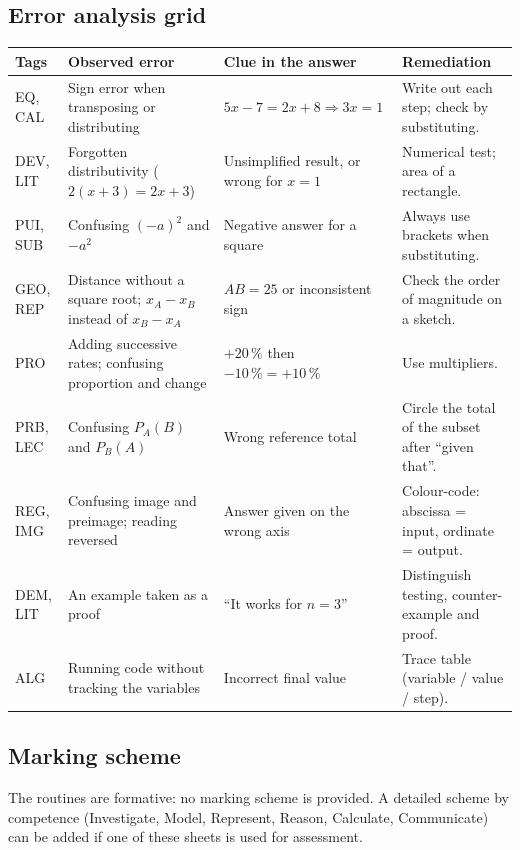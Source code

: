 \subsection*{Error analysis grid}
{\footnotesize\renewcommand{\arraystretch}{1.2}
\begin{tabular}{@{}p{2.2cm} p{4.4cm} p{4.8cm} p{4.6cm}@{}}\toprule
Tags & Observed error & Clue in the answer & Remediation \\ \midrule
EQ, CAL & Sign error when transposing or distributing & $5x-7=2x+8\Rightarrow3x=1$ & Write out each step; check by substituting. \\
DEV, LIT & Forgotten distributivity ($2(x+3)=2x+3$) & Unsimplified result, or wrong for $x=1$ & Numerical test; area of a rectangle. \\
PUI, SUB & Confusing $(-a)^2$ and $-a^2$ & Negative answer for a square & Always use brackets when substituting. \\
GEO, REP & Distance without a square root; $x_A-x_B$ instead of $x_B-x_A$ & $AB=25$ or inconsistent sign & Check the order of magnitude on a sketch. \\
PRO & Adding successive rates; confusing proportion and change & $+20\,\%$ then $-10\,\%=+10\,\%$ & Use multipliers. \\
PRB, LEC & Confusing $P_A(B)$ and $P_B(A)$ & Wrong reference total & Circle the total of the subset after ``given that''. \\
REG, IMG & Confusing image and preimage; reading reversed & Answer given on the wrong axis & Colour-code: abscissa = input, ordinate = output. \\
DEM, LIT & An example taken as a proof & ``It works for $n=3$'' & Distinguish testing, counter-example and proof. \\
ALG & Running code without tracking the variables & Incorrect final value & Trace table (variable / value / step). \\ \bottomrule
\end{tabular}}

\subsection*{Marking scheme}
The routines are formative: no marking scheme is provided. A detailed scheme by competence (Investigate, Model, Represent, Reason, Calculate, Communicate) can be added if one of these sheets is used for assessment.

